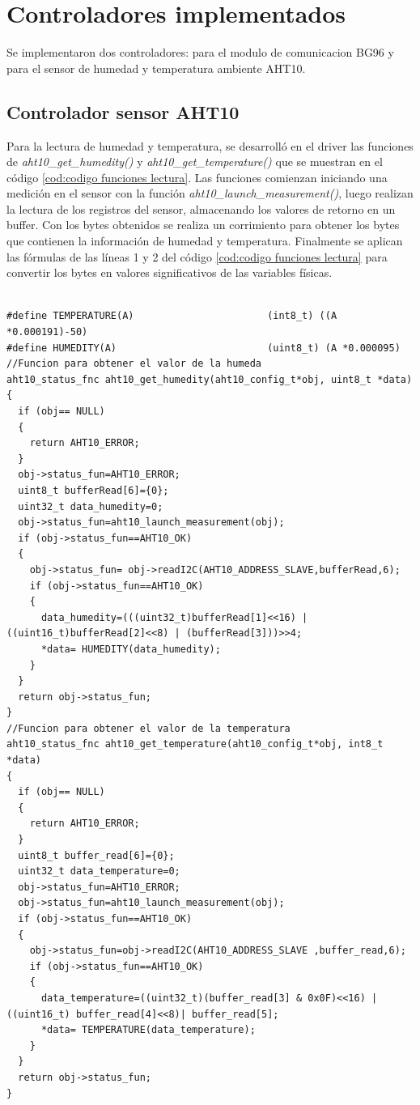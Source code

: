 \section{Controladores implementados}
Se implementaron dos controladores: para el modulo de comunicacion BG96 y para el sensor de humedad y temperatura ambiente AHT10.

\subsection{Controlador sensor AHT10} 

Para la lectura de humedad y temperatura, se desarrolló en el driver las funciones de \emph{aht10\_get\_humedity()} y \emph{aht10\_get\_temperature()} que se muestran en el código \ref{cod:codigo funciones lectura}.
Las funciones comienzan iniciando una medición en el sensor con la función \emph{aht10\_launch\_measurement()}, luego realizan la lectura de los registros del sensor, almacenando los valores de retorno en un buffer. Con los bytes obtenidos se realiza un corrimiento para  obtener los bytes que contienen la información de humedad y temperatura. Finalmente se aplican las fórmulas de las líneas 1 y 2 del código \ref{cod:codigo funciones lectura} para convertir los bytes en valores significativos de las variables físicas.
 
\begin{lstlisting}[label=cod:codigo funciones lectura ,caption=Funciones de lectura de humedad y temperatura.]  % Start your code-block

#define TEMPERATURE(A)                       (int8_t) ((A *0.000191)-50)       
#define HUMEDITY(A)                          (uint8_t) (A *0.000095)        
//Funcion para obtener el valor de la humeda
aht10_status_fnc aht10_get_humedity(aht10_config_t*obj, uint8_t *data)
{
  if (obj== NULL)
  {
    return AHT10_ERROR;
  }
  obj->status_fun=AHT10_ERROR;
  uint8_t bufferRead[6]={0};
  uint32_t data_humedity=0;
  obj->status_fun=aht10_launch_measurement(obj);
  if (obj->status_fun==AHT10_OK)
  {
    obj->status_fun= obj->readI2C(AHT10_ADDRESS_SLAVE,bufferRead,6);
    if (obj->status_fun==AHT10_OK)
    {
      data_humedity=(((uint32_t)bufferRead[1]<<16) | ((uint16_t)bufferRead[2]<<8) | (bufferRead[3]))>>4;
      *data= HUMEDITY(data_humedity);
    }
  }
  return obj->status_fun;
}
//Funcion para obtener el valor de la temperatura 
aht10_status_fnc aht10_get_temperature(aht10_config_t*obj, int8_t *data)
{
  if (obj== NULL)
  {
    return AHT10_ERROR;
  } 
  uint8_t buffer_read[6]={0};
  uint32_t data_temperature=0;
  obj->status_fun=AHT10_ERROR;
  obj->status_fun=aht10_launch_measurement(obj);
  if (obj->status_fun==AHT10_OK)
  {
    obj->status_fun=obj->readI2C(AHT10_ADDRESS_SLAVE ,buffer_read,6);
    if (obj->status_fun==AHT10_OK)
    {
      data_temperature=((uint32_t)(buffer_read[3] & 0x0F)<<16) | ((uint16_t) buffer_read[4]<<8)| buffer_read[5];
      *data= TEMPERATURE(data_temperature);
    }
  }
  return obj->status_fun;
}
\end{lstlisting}


